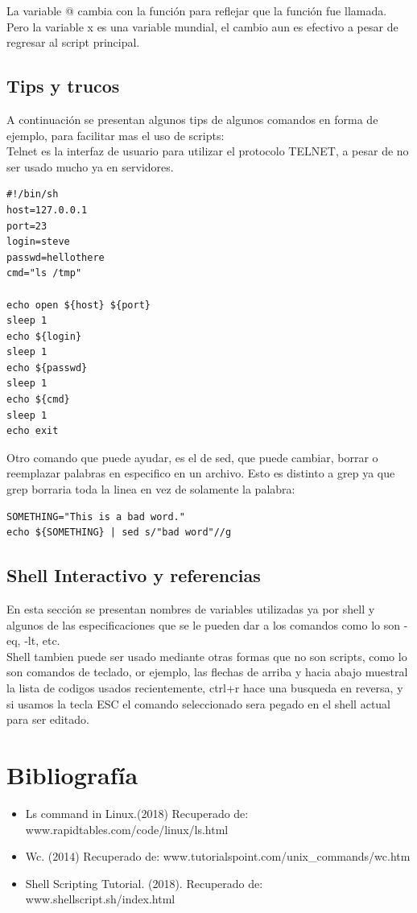 \documentclass[12pt]{article}
\begin{document}
La variable @ cambia con la función para reflejar que la función fue llamada. Pero la variable x es una variable mundial, el cambio aun es efectivo a pesar de regresar al script principal. 

\subsection{Tips y trucos}
A continuación se presentan algunos tips de algunos comandos en forma de ejemplo, para facilitar mas el uso de scripts: \\

Telnet es la interfaz de usuario para utilizar el protocolo TELNET, a pesar de no ser usado mucho ya en servidores. 

\begin{verbatim}
#!/bin/sh
host=127.0.0.1
port=23
login=steve
passwd=hellothere
cmd="ls /tmp"

echo open ${host} ${port}
sleep 1
echo ${login}
sleep 1
echo ${passwd}
sleep 1
echo ${cmd}
sleep 1
echo exit
\end{verbatim}

Otro comando que puede ayudar, es el de sed, que puede cambiar, borrar o reemplazar palabras en especifico en un archivo. Esto es distinto a grep ya que grep borraria toda la linea en vez de solamente la palabra:

\begin{verbatim}
SOMETHING="This is a bad word."
echo ${SOMETHING} | sed s/"bad word"//g
\end{verbatim}

\subsection{Shell Interactivo y referencias}
En esta sección se presentan nombres de variables utilizadas ya por shell y algunos de las especificaciones que se le pueden dar a los comandos como lo son -eq, -lt, etc. \\

Shell tambien puede ser usado mediante otras formas que no son scripts, como lo son comandos de teclado, or ejemplo, las flechas de arriba y hacia abajo muestral la lista de codigos usados recientemente, ctrl+r hace una busqueda en reversa, y si usamos la tecla ESC el comando seleccionado sera pegado en el shell actual para ser editado.

\section{Bibliografía}
\begin{itemize}
    \item Ls command in Linux.(2018) Recuperado de: www.rapidtables.com/code/linux/ls.html
    \item Wc. (2014) Recuperado de: www.tutorialspoint.com/unix\_commands/wc.htm
    \item Shell Scripting Tutorial. (2018). Recuperado de: www.shellscript.sh/index.html
\end{itemize}
\end{document}
